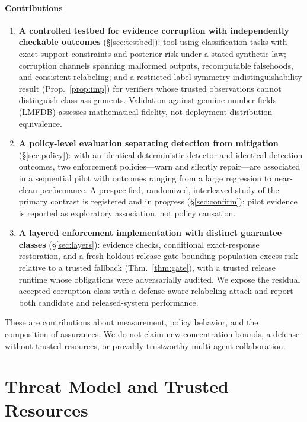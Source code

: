 \documentclass[conference]{IEEEtran}
\begin{document}
\paragraph{Contributions}
\begin{enumerate}
\item \textbf{A controlled testbed for evidence corruption with
independently checkable outcomes} (\S\ref{sec:testbed}): tool-using
classification tasks with exact support constraints and posterior
risk under a stated synthetic law; corruption channels spanning
malformed outputs, recomputable falsehoods, and consistent
relabeling; and a restricted label-symmetry indistinguishability
result (Prop.~\ref{prop:imp}) for verifiers whose trusted observations
cannot distinguish class assignments. Validation against genuine
number fields (LMFDB) assesses mathematical fidelity, not
deployment-distribution equivalence.
\item \textbf{A policy-level evaluation separating detection from
mitigation} (\S\ref{sec:policy}): with an identical deterministic
detector and identical detection outcomes, two enforcement
policies---warn and silently repair---are associated in a sequential
pilot with outcomes ranging from a large regression to near-clean
performance. A prespecified, randomized, interleaved study of the
primary contrast is registered and in progress (\S\ref{sec:confirm});
pilot evidence is reported as exploratory association, not policy
causation.
\item \textbf{A layered enforcement implementation with distinct
guarantee classes} (\S\ref{sec:layers}): evidence checks, conditional
exact-response restoration, and a fresh-holdout release gate bounding
population excess risk relative to a trusted fallback
(Thm.~\ref{thm:gate}), with a trusted release runtime whose
obligations were adversarially audited. We expose the residual
accepted-corruption class with a defense-aware relabeling attack and
report both candidate and released-system performance.
\end{enumerate}

These are contributions about measurement, policy behavior, and the
composition of assurances. We do not claim new concentration bounds,
a defense without trusted resources, or provably trustworthy
multi-agent collaboration.

\section{Threat Model and Trusted Resources}\label{sec:threat}
\end{document}
